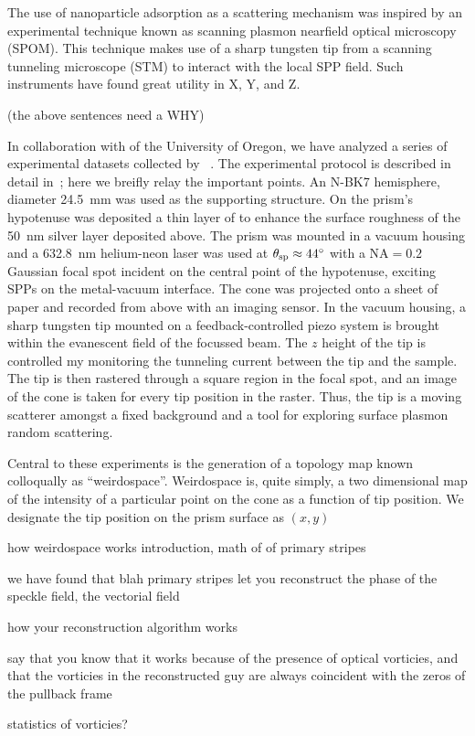 The use of nanoparticle adsorption as a scattering mechanism was inspired
by an experimental technique known as scanning plasmon nearfield optical
microscopy (SPOM).  This technique makes use of a sharp tungsten tip from a
scanning tunneling microscope (STM) to interact with the local SPP field.
Such instruments have found great utility in X, Y, and Z.

(the above sentences need a WHY)

In collaboration with  of the University of Oregon,
we have analyzed a series of experimental datasets collected by
~\cite{schumann2009surface}.  The experimental protocol is
described in detail in~\cite{schumann2009surface}; here we breifly relay
the important points.  An N-BK7 hemisphere, diameter
\SI{24.5}{\milli\meter} was used as the supporting structure.  On the
prism's hypotenuse was deposited a thin layer of  to enhance the
surface roughness of the \SI{50}{\nano\meter} silver layer deposited above.
The prism was mounted in a vacuum housing and a \SI{632.8}{\nano\meter}
helium-neon laser was used at $\theta_\mathrm{sp}\approx\SI{44}{\degree}$ with a
$\mathrm{NA}=0.2$ Gaussian focal spot incident on the central point of the
hypotenuse, exciting SPPs on the metal-vacuum interface.  The cone was
projected onto a sheet of paper and recorded from above with an imaging
sensor.  In the vacuum housing, a sharp tungsten tip mounted on a
feedback-controlled piezo system is brought within the evanescent field of
the focussed beam.  The $z$ height of the tip is controlled my monitoring
the tunneling current between the tip and the sample.  The tip is then
rastered through a square region in the focal spot, and an image of the
cone is taken for every tip position in the raster.  Thus, the tip is a
moving scatterer amongst a fixed background and a tool for exploring
surface plasmon random scattering.

Central to these experiments is the generation of a topology map known
colloqually as ``weirdospace''.  Weirdospace is, quite simply, a two
dimensional map of the intensity of a particular point on the cone as a
function of tip position.  We designate the tip position on the prism
surface as $(x,y)$

how weirdospace works
introduction, math of of primary stripes

we have found that blah primary stripes let you reconstruct the phase of
the speckle field, the vectorial field 

how your reconstruction algorithm works

say that you know that it works because of the presence of optical
vorticies, and that the vorticies in the reconstructed guy are always
coincident with the zeros of the pullback frame

statistics of vorticies?
